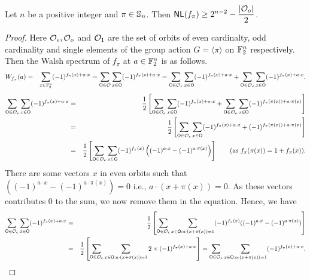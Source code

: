 \documentclass{llncs}
\begin{document}
\begin{theorem}\label{thm:nlbfpi}
Let $n$ be a positive integer and $\pi \in \mathbb{S}_n$.
Then $\displaystyle{\mathsf{NL}(f_\pi) \ge 2^{n-2} - \frac{|\mathcal{O}_o|}{2}}$.
\end{theorem}
\begin{proof}
Here $\mathcal{O}_e, \mathcal{O}_o$ and $\mathcal{O}_1$ are the set of orbits 
of even cardinalty, odd cardinality and single elements of the group action $G = \langle \pi \rangle$ on $\mathbb{F}_2^n$ respectively.
Then the Walsh spectrum of $f_\pi$ at $a \in \mathbb{F}_2^n$ is as follows.
\begin{eqnarray}\label{eqn:wspi}
W_{f_\pi}(a) & =  &\sum_{x \in \mathbb{F}_2^n} (-1)^{f_\pi(x)+a \cdot x} 
= \sum_{\mathsf{O} \in \mathcal{O}} \sum_{x \in \mathsf{O}} (-1)^{f_\pi(x)+ a \cdot x}
= \sum_{\mathsf{O} \in \mathcal{O}_e} \sum_{x \in \mathsf{O}} (-1)^{ f_\pi(x) + a \cdot x} + \sum_{\mathsf{O} \in \mathcal{O}_o} \sum_{x \in \mathsf{O}} (-1)^{ f_\pi (x) + a \cdot x}.
\end{eqnarray}
\begin{eqnarray*}
\sum_{\mathsf{O} \in \mathcal{O}_e} \sum_{x \in \mathsf{O}} (-1)^{ f_\pi(x) + a \cdot x}  
& = & \frac{1}{2} \left[ \sum_{\mathsf{O} \in \mathcal{O}_e} \sum_{x \in \mathsf{O}} (-1)^{ f_\pi(x) + a \cdot x} + \sum_{\mathsf{O} \in \mathcal{O}_e} \sum_{x \in \mathsf{O}} (-1)^{ f_\pi(\pi(x)) + a \cdot \pi(x)} \right] \\
& = & \frac{1}{2} \left[ \sum_{\mathsf{O} \in \mathcal{O}_e} \sum_{x \in \mathsf{O}} (-1)^{ f_\pi(x) + a \cdot x} + (-1)^{f_\pi(\pi(x))+ a \cdot \pi(x)}   \right]  \\
& = & \frac{1}{2} \left[ \sum_{\mathsf{O} \in \mathcal{O}_e} \sum_{x \in \mathsf{O}} (-1)^{ f_\pi(x)} \left((-1)^{a \cdot x} - (-1)^{ a \cdot \pi(x)}\right) \right]~~~~~~(\text{as }f_\pi(\pi(x)) = 1+f_\pi(x)).
\end{eqnarray*}
There are some vectors $x$ in even orbits such that $((-1)^{ a \cdot x} - (-1)^{a \cdot \pi(x)}) = 0$ i.e., $a \cdot (x + \pi(x))= 0$. As these vectors contributes $0$ to the sum, we now remove them in the equation. Hence, we have
\begin{eqnarray}\label{eqn:oddeven}
\sum_{\mathsf{O} \in \mathcal{O}_e} \sum_{x \in \mathsf{O}} (-1)^{ f_\pi(x) + a \cdot x} 
& = & \frac{1}{2} \left[ \sum_{\mathsf{O} \in \mathcal{O}_e} \sum_{x \in \mathsf{O} : a \cdot (x + \pi(x))= 1} (-1)^{f_\pi(x)} ((-1)^{ a \cdot x} - (-1)^{a \cdot \pi(x)})  \right] \nonumber\\
& = & \frac{1}{2} \left[ \sum_{\mathsf{O} \in \mathcal{O}_e} \sum_{x \in \mathsf{O} : a \cdot (x + \pi(x))= 1 } 2 \times (-1)^{f_\pi(x)+ a \cdot x}  \right] = \sum_{\mathsf{O} \in \mathcal{O}_e} \sum_{x \in \mathsf{O} : a \cdot (x + \pi(x))= 1 } (-1)^{f_\pi(x)+ a \cdot x}.
\end{eqnarray}


\end{proof}
\end{document}
